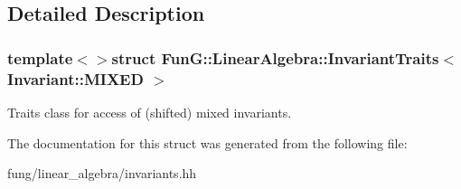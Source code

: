 \subsection{Detailed Description}
\subsubsection*{template$<$$>$struct Fun\-G\-::\-Linear\-Algebra\-::\-Invariant\-Traits$<$ Invariant\-::\-M\-I\-X\-E\-D $>$}

Traits class for access of (shifted) mixed invariants. 

The documentation for this struct was generated from the following file\-:\begin{DoxyCompactItemize}
\item 
fung/linear\-\_\-algebra/invariants.\-hh\end{DoxyCompactItemize}
